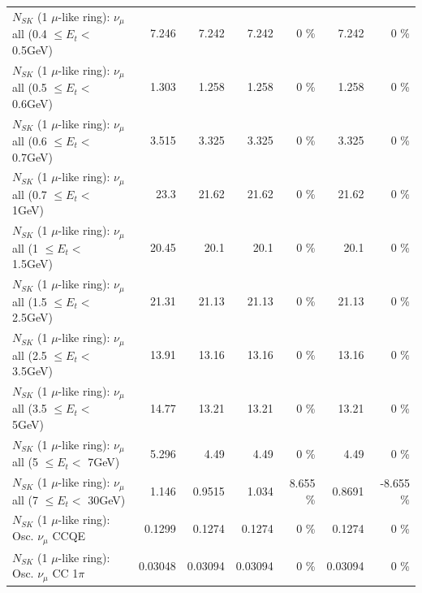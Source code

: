 \begin{table}
\begin{tabular}{| l | r | r | r  r | r  r |}
       $N_{SK}$ (1 $\mu$-like ring): $\nu_{\mu}$ all (0.4 $\leq E_{t} <$ 0.5GeV) &           7.246 &           7.242 &           7.242 &        0 \%  &           7.242 &        0 \%  \\ 
       $N_{SK}$ (1 $\mu$-like ring): $\nu_{\mu}$ all (0.5 $\leq E_{t} <$ 0.6GeV) &           1.303 &           1.258 &           1.258 &        0 \%  &           1.258 &        0 \%  \\ 
       $N_{SK}$ (1 $\mu$-like ring): $\nu_{\mu}$ all (0.6 $\leq E_{t} <$ 0.7GeV) &           3.515 &           3.325 &           3.325 &        0 \%  &           3.325 &        0 \%  \\ 
         $N_{SK}$ (1 $\mu$-like ring): $\nu_{\mu}$ all (0.7 $\leq E_{t} <$ 1GeV) &            23.3 &           21.62 &           21.62 &        0 \%  &           21.62 &        0 \%  \\ 
         $N_{SK}$ (1 $\mu$-like ring): $\nu_{\mu}$ all (1 $\leq E_{t} <$ 1.5GeV) &           20.45 &            20.1 &            20.1 &        0 \%  &            20.1 &        0 \%  \\ 
       $N_{SK}$ (1 $\mu$-like ring): $\nu_{\mu}$ all (1.5 $\leq E_{t} <$ 2.5GeV) &           21.31 &           21.13 &           21.13 &        0 \%  &           21.13 &        0 \%  \\ 
       $N_{SK}$ (1 $\mu$-like ring): $\nu_{\mu}$ all (2.5 $\leq E_{t} <$ 3.5GeV) &           13.91 &           13.16 &           13.16 &        0 \%  &           13.16 &        0 \%  \\ 
         $N_{SK}$ (1 $\mu$-like ring): $\nu_{\mu}$ all (3.5 $\leq E_{t} <$ 5GeV) &           14.77 &           13.21 &           13.21 &        0 \%  &           13.21 &        0 \%  \\ 
           $N_{SK}$ (1 $\mu$-like ring): $\nu_{\mu}$ all (5 $\leq E_{t} <$ 7GeV) &           5.296 &            4.49 &            4.49 &        0 \%  &            4.49 &        0 \%  \\ 
          $N_{SK}$ (1 $\mu$-like ring): $\nu_{\mu}$ all (7 $\leq E_{t} <$ 30GeV) &           1.146 &          0.9515 &           1.034 &    8.655 \%  &          0.8691 &   -8.655 \%  \\ 
\hline
\hline
                               $N_{SK}$ (1 $\mu$-like ring): Osc. $\nu_\mu$ CCQE &          0.1299 &          0.1274 &          0.1274 &        0 \%  &          0.1274 &        0 \%  \\ 
                          $N_{SK}$ (1 $\mu$-like ring): Osc. $\nu_\mu$ CC 1$\pi$ &         0.03048 &         0.03094 &         0.03094 &        0 \%  &         0.03094 &        0 \%  \\ 

\end{tabular}
\end{table}
